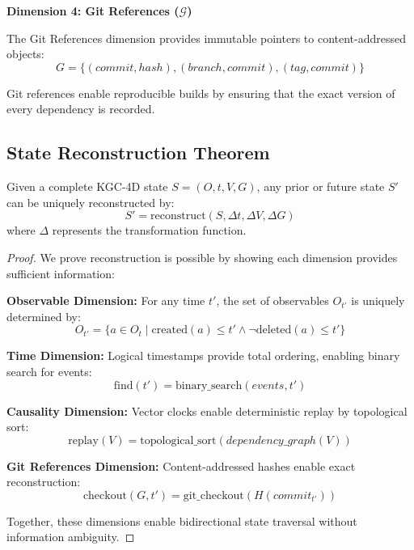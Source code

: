 \textbf{Dimension 4: Git References (\(\mathcal{G}\))}

The Git References dimension provides immutable pointers to content-addressed objects:
\begin{equation}
    G = \{(commit, hash), (branch, commit), (tag, commit)\}
\end{equation}

Git references enable reproducible builds by ensuring that the exact version of every dependency is recorded.

\subsection{State Reconstruction Theorem}

\begin{theorem}
    Given a complete KGC-4D state \(S = (O, t, V, G)\), any prior or future state \(S'\) can be uniquely reconstructed by:
    \begin{equation}
        S' = \text{reconstruct}(S, \Delta t, \Delta V, \Delta G)
    \end{equation}
    where \(\Delta\) represents the transformation function.
\end{theorem}

\begin{proof}
    We prove reconstruction is possible by showing each dimension provides sufficient information:

    \textbf{Observable Dimension:} For any time \(t'\), the set of observables \(O_{t'}\) is uniquely determined by:
    \begin{equation}
        O_{t'} = \{a \in O_t \mid \text{created}(a) \leq t' \land \neg \text{deleted}(a) \leq t'\}
    \end{equation}

    \textbf{Time Dimension:} Logical timestamps provide total ordering, enabling binary search for events:
    \begin{equation}
        \text{find}(t') = \text{binary\_search}(events, t')
    \end{equation}

    \textbf{Causality Dimension:} Vector clocks enable deterministic replay by topological sort:
    \begin{equation}
        \text{replay}(V) = \text{topological\_sort}(dependency\_graph(V))
    \end{equation}

    \textbf{Git References Dimension:} Content-addressed hashes enable exact reconstruction:
    \begin{equation}
        \text{checkout}(G, t') = \text{git\_checkout}(H(commit_{t'}))
    \end{equation}

    Together, these dimensions enable bidirectional state traversal without information ambiguity.
\end{proof}

